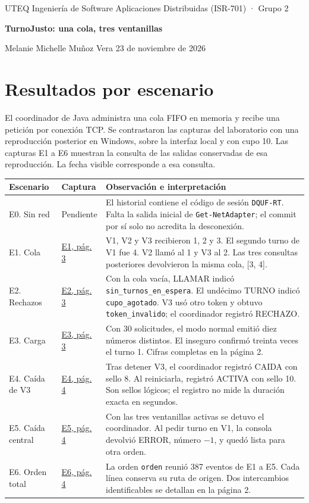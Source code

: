 \documentclass[11pt,a4paper]{article}
\begin{document}
{\small UTEQ \quad Ingeniería de Software \quad Aplicaciones Distribuidas (ISR-701) · Grupo 2}\par
{\LARGE\bfseries TurnoJusto: una cola, tres ventanillas}\par
Melanie Michelle Muñoz Vera \hfill 23 de noviembre de 2026

\section*{Resultados por escenario}
El coordinador de Java administra una cola FIFO en memoria y recibe una petición por conexión TCP. Se contrastaron las capturas del laboratorio con una reproducción posterior en Windows, sobre la interfaz local y con cupo 10. Las capturas E1 a E6 muestran la consulta de las salidas conservadas de esa reproducción. La fecha visible corresponde a esa consulta.

{\small\renewcommand{\arraystretch}{1.35}
\begin{tabularx}{\linewidth}{@{}p{2.55cm}p{2.25cm}X@{}}
\toprule
Escenario & Captura & Observación e interpretación\\ \midrule
E0. Sin red & Pendiente & El historial contiene el código de sesión \texttt{DQUF-RT}. Falta la salida inicial de \texttt{Get-NetAdapter}; el commit por sí solo no acredita la desconexión.\\
E1. Cola & \hyperlink{E1}{E1, pág. 3} & V1, V2 y V3 recibieron 1, 2 y 3. El segundo turno de V1 fue 4. V2 llamó al 1 y V3 al 2. Las tres consultas posteriores devolvieron la misma cola, [3, 4].\\
E2. Rechazos & \hyperlink{E2}{E2, pág. 3} & Con la cola vacía, LLAMAR indicó \texttt{sin\_turnos\_en\_espera}. El undécimo TURNO indicó \texttt{cupo\_agotado}. V3 usó otro token y obtuvo \texttt{token\_invalido}; el coordinador registró RECHAZO.\\
E3. Carga & \hyperlink{E3}{E3, pág. 3} & Con 30 solicitudes, el modo normal emitió diez números distintos. El inseguro confirmó treinta veces el turno 1. Cifras completas en la página 2.\\
E4. Caída de V3 & \hyperlink{E4}{E4, pág. 4} & Tras detener V3, el coordinador registró CAIDA con sello 8. Al reiniciarla, registró ACTIVA con sello 10. Son sellos lógicos; el registro no mide la duración exacta en segundos.\\
E5. Caída central & \hyperlink{E5}{E5, pág. 4} & Con las tres ventanillas activas se detuvo el coordinador. Al pedir turno en V1, la consola devolvió ERROR, número $-1$, y quedó lista para otra orden.\\
E6. Orden total & \hyperlink{E6}{E6, pág. 4} & La orden \texttt{orden} reunió 387 eventos de E1 a E5. Cada línea conserva su ruta de origen. Dos intercambios identificables se detallan en la página 2.\\
\bottomrule
\end{tabularx}}
\end{document}
